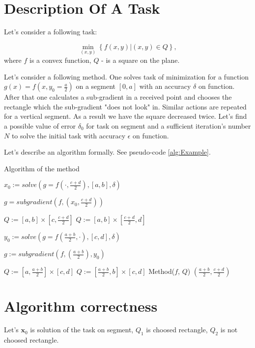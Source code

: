 \documentclass[12pt]{article}
\begin{document}
\section{Description Of A Task}

Let's consider a following task:

$$\min_{(x,y)}\left\{f(x,y)|(x,y) \in Q\right\},$$
where $f$ is a convex function, $Q$ - is a square on the plane.

Let's consider a following method. One solves task of minimization for a function $g(x) = f\left(x, y_0 = \frac{a}{2}\right)$ on a segment $[0, a]$ with an accuracy $\delta$ on function. After that one calculates a sub-gradient in a received point and chooses the rectangle which the sub-gradient "does not look" in. Similar actions are repeated for a vertical segment. As a result we have the square decreased twice. Let's find a possible value of error $\delta_0$ for task on segment and a sufficient iteration's number $N$ to solve the initial task with accuracy $\epsilon$ on function.

Let's describe an algorithm formally. See pseudo-code \ref{alg:Example}.

\begin{algorithm}[H]
\caption{Algorithm of the method}\label{alg:Example}
\begin{algorithmic}[1]

$x_0:= solve(g = f(\cdot, \frac{c+d}{2}), [a,b], \delta)$
 
$g = subgradient(f, (x_0, \frac{c+d}{2}))$
 
\State$Q := [a,b] \times [c, \frac{c+d}{2}]$ 
\Else
\State$Q := [a,b] \times [\frac{c+d}{2}, d]$ 
\EndIf

 $y_0:= solve(g = f(\frac{a+b}{2}, \cdot), [c,d], \delta)$
 
 $g := subgradient(f, (\frac{a+b}{2}), y_0)$
 
 \State$Q := [a, \frac{a+b}{2}] \times [c, d]$ 
\Else
\State$Q := [\frac{a+b}{2},b] \times [c, d]$ 
\EndIf
{}
\State Method($f$, $Q$) 
\EndIf
\Return $(\frac{a+b}{2}, \frac{c+d}{2})$
\EndFunction 
 \end{algorithmic}
\end{algorithm}

\section{Algorithm correctness}
Let's $\textbf{x}_0$ is solution of the task on segment, $Q_1$ is choosed rectangle, $Q_2$ is not choosed rectangle.
\end{document}

